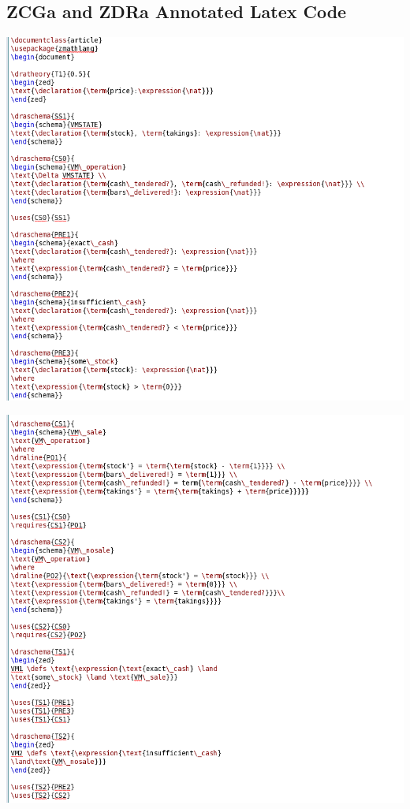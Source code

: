 \subsection{ZCGa and ZDRa Annotated Latex Code}
\label{app:vm1n2}
\includegraphics[scale=0.5]{examples/vm/1n2imagea.png}

\noindent \includegraphics[scale=0.5]{examples/vm/1n2imageb.png}

